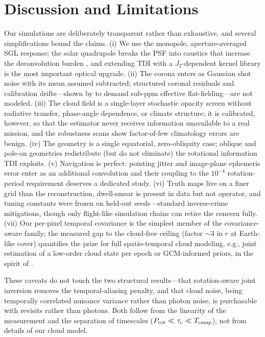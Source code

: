 ﻿\documentclass[twocolumn,10pt]{article}
\begin{document}
\section{Discussion and Limitations}
\label{sec:discussion}

Our simulations are deliberately transparent rather than exhaustive, and
several simplifications bound the claims. (i) We use the monopole,
aperture-averaged SGL response; the solar quadrupole breaks the PSF into
caustics that increase the deconvolution burden \citep{tt21quad}, and
extending TDI with a $J_2$-dependent kernel library is the most
important optical upgrade. (ii) The corona enters as Gaussian shot noise
with its mean assumed subtracted; structured coronal residuals and
calibration drifts---shown by \citet{tur26bench} to demand sub-ppm
effective flat-fielding---are not modeled. (iii) The cloud field is a
single-layer stochastic opacity screen without radiative transfer,
phase-angle dependence, or climate structure; it is calibrated,
however, so that the estimator never receives information unavailable
to a real mission, and the robustness scans show factor-of-few
climatology errors are benign. (iv) The geometry is a single equatorial,
zero-obliquity case; oblique and pole-on geometries redistribute (but do
not eliminate) the rotational information TDI exploits. (v) Navigation
is perfect: pointing jitter and image-plane ephemeris error enter as an
additional convolution and their coupling to the $10^{-4}$
rotation-period requirement deserves a dedicated study. (vi) Truth maps
live on a finer grid than the reconstruction, dwell-smear is present in
data but not operator, and tuning constants were frozen on held-out
seeds---standard inverse-crime mitigations, though only flight-like
simulation chains \citep{tur26bench} can retire the concern fully.
(vii) Our per-pixel temporal covariance is the simplest member of the
covariance-aware family; the measured gap to the cloud-free ceiling
(factor $\sim$3 in $r$ at Earth-like cover) quantifies the prize for
full spatio-temporal cloud modeling, e.g., joint estimation of a
low-order cloud state per epoch or GCM-informed priors, in the spirit
of \citet{cov26}.

These caveats do not touch the two structural results---that
rotation-aware joint inversion removes the temporal-aliasing penalty,
and that cloud noise, being temporally correlated nuisance variance
rather than photon noise, is purchasable with revisits rather than
photons. Both follow from the linearity of the measurement and the
separation of timescales ($P_{\rm rot}\ll\tau_c\ll T_{\rm camp}$), not
from details of our cloud model.
\end{document}
